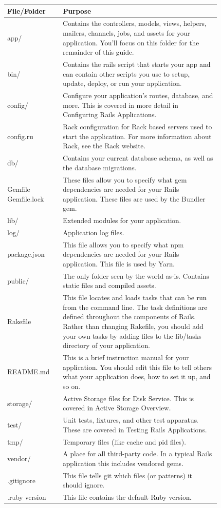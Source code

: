\documentclass[conference]{IEEEtran}
\begin{document}
\begin{tabular}[h!]{ |p{0.22\linewidth}|p{0.65\linewidth}| }
\hline
\textbf{File/Folder} & \textbf{Purpose} \\
\hline
app/ & Contains the controllers, models, views, helpers, mailers, channels, jobs, and assets for your application. You'll focus on this folder for the remainder of this guide. \\
\hline
bin/ & Contains the rails script that starts your app and can contain other scripts you use to setup, update, deploy, or run your application. \\
\hline
config/ & Configure your application's routes, database, and more. This is covered in more detail in Configuring Rails Applications. \\
\hline
config.ru & Rack configuration for Rack based servers used to start the application. For more information about Rack, see the Rack website. \\
\hline
db/ & Contains your current database schema, as well as the database migrations. \\
\hline
Gemfile
Gemfile.lock & These files allow you to specify what gem dependencies are needed for your Rails application. These files are used by the Bundler gem. \\
\hline
lib/ & Extended modules for your application. \\
\hline
log/ & Application log files. \\
\hline
package.json & This file allows you to specify what npm dependencies are needed for your Rails application. This file is used by Yarn. \\
\hline
public/ & The only folder seen by the world as-is. Contains static files and compiled assets. \\
\hline
Rakefile & This file locates and loads tasks that can be run from the command line. The task definitions are defined throughout the components of Rails. Rather than changing Rakefile, you should add your own tasks by adding files to the lib/tasks directory of your application. \\
\hline
README.md & This is a brief instruction manual for your application. You should edit this file to tell others what your application does, how to set it up, and so on. \\
\hline
storage/ & Active Storage files for Disk Service. This is covered in Active Storage Overview. \\
\hline
test/ & Unit tests, fixtures, and other test apparatus. These are covered in Testing Rails Applications. \\
\hline
tmp/ & Temporary files (like cache and pid files). \\
\hline
vendor/ & A place for all third-party code. In a typical Rails application this includes vendored gems. \\
\hline
.gitignore & This file tells git which files (or patterns) it should ignore. \\
\hline
.ruby-version & This file contains the default Ruby version. \\
\hline
\end{tabular}
\end{document}
